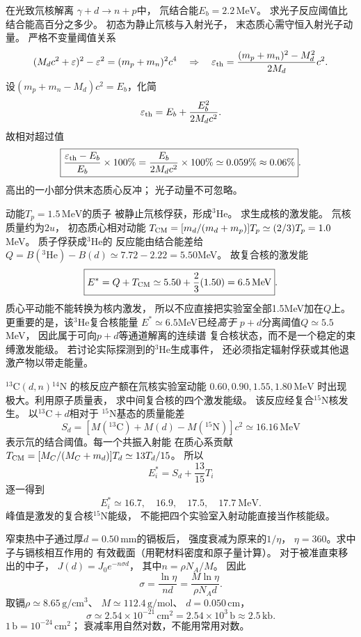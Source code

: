 在光致氘核解离
$\gamma+d\to n+p$中，
氘结合能$E_b=2.2\,\mathrm{MeV}$。
求光子反应阈值比结合能高百分之多少。
\exsolution
初态为静止氘核与入射光子，
末态质心需守恒入射光子动量。
严格不变量阈值关系
\[
 (M_dc^2+\varepsilon)^2-\varepsilon^2
 =(m_p+m_n)^2c^4
 \quad\Rightarrow\quad
 \varepsilon_{\rm th}
 =\frac{(m_p+m_n)^2-M_d^2}{2M_d}c^2.
\]
设$(m_p+m_n-M_d)c^2=E_b$，化简
\[
 \varepsilon_{\rm th}
 =E_b+\frac{E_b^2}{2M_dc^2}.
\]
故相对超过值
\[
 \boxed{\frac{\varepsilon_{\rm th}-E_b}{E_b}\times100\%
 =\frac{E_b}{2M_dc^2}\times100\%
 \simeq0.059\%\approx0.06\%}.
\]
\excheck 高出的一小部分供末态质心反冲；
光子动量不可忽略。

动能$T_p=1.5\,\mathrm{MeV}$的质子
被静止氘核俘获，形成$^{3}\mathrm{He}$。
求生成核的激发能。
\exsolution
氘核质量约为$2u$，
初态质心相对动能
$T_{\rm CM}=[m_d/(m_d+m_p)]T_p
\simeq(2/3)T_p=1.0$MeV。
质子俘获成$^{3}\mathrm{He}$的
反应能由结合能差给
$Q=B(^{3}\mathrm{He})-B(d)
\simeq7.72-2.22=5.50$MeV。
故复合核的激发能
\[
 \boxed{E^*=Q+T_{\rm CM}
 \simeq5.50+\frac23(1.50)
 =6.5\,\mathrm{MeV}}.
\]
\excheck 质心平动能不能转换为核内激发，
所以不应直接把实验室全部1.5MeV加在$Q$上。
更重要的是，该$^{3}$He复合核能量
$E^*\simeq6.5$MeV已经\emph{高于}
$p+d$分离阈值$Q\simeq5.5$MeV，
因此属于可向$p+d$等通道解离的连续谱
复合核状态，而不是一个稳定的束缚激发能级。
若讨论实际探测到的$^{3}$He生成事件，
还必须指定辐射俘获或其他退激产物以带走能量。

$^{13}\mathrm C(d,n){}^{14}\mathrm N$
的核反应产额在氘核实验室动能
$0.60,0.90,1.55,1.80\,\mathrm{MeV}$
时出现极大。利用原子质量表，
求中间复合核的四个激发能级。
\exsolution
该反应经复合$^{15}\mathrm N$核发生。
以$^{13}\mathrm C+d$相对于
$^{15}\mathrm N$基态的质量能差
\[
 S_d=[M(^{13}\mathrm C)+M(d)-M(^{15}\mathrm N)]c^2
 \simeq16.16\,\mathrm{MeV}
\]
表示氘的结合阈值。每一个共振入射能
在质心系贡献
$T_{\rm CM}=[M_C/(M_C+m_d)]T_d
\simeq13T_d/15$。
所以
\[
 \boxed{E_i^*=S_d+\frac{13}{15}T_i}
\]
逐一得到
\[
 \boxed{E_i^*\simeq
 16.7,\quad16.9,\quad17.5,\quad17.7\ \mathrm{MeV}}.
\]
\excheck 峰值是激发的复合核$^{15}$N能级，
不能把四个实验室入射动能直接当作核能级。

窄束热中子通过厚$d=0.50\,\mathrm{mm}$的镉板后，
强度衰减为原来的$1/\eta$，
$\eta=360$。求中子与镉核相互作用的
有效截面（用靶材料密度和原子量计算）。
\exsolution
对于被准直束移出的中子，
$J(d)=J_0e^{-n\sigma d}$，
其中$n=\rho N_A/M$。
因此
\[
 \boxed{\sigma=\frac{\ln\eta}{nd}
 =\frac{M\ln\eta}{\rho N_A d}}.
\]
取镉$\rho\simeq8.65\,\mathrm{g/cm^3}$、
$M\simeq112.4\,\mathrm{g/mol}$、
$d=0.050\,\mathrm{cm}$，
\[
 \boxed{\sigma\simeq2.54\times10^{-21}\,\mathrm{cm^2}
 =2.54\times10^3\,\mathrm b\approx2.5\,\mathrm{kb}}.
\]
\excheck $1\,\mathrm b=10^{-24}\,\mathrm{cm^2}$；
衰减率用自然对数，不能用常用对数。

